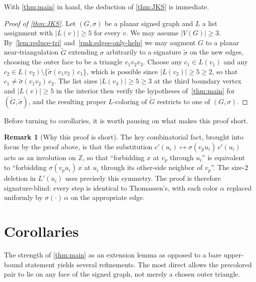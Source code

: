 \documentclass[11pt,a4paper]{article}
\theoremstyle{plain}
\theoremstyle{definition}
\newtheorem{remark}[theorem]{Remark}
\newcommand{\Z}{\mathbb{Z}}
\newcommand{\V}{V}
\newcommand{\Gs}{(G,\sigma)}
\begin{document}
With \cref{thm:main} in hand, the deduction of \cref{thm:JKS} is
immediate.

\begin{proof}[Proof of \cref{thm:JKS}]
Let $\Gs$ be a planar signed graph and $L$ a list assignment with
$|L(v)|\ge 5$ for every $v$. We may assume $|\V(G)|\ge 3$.
By~\cref{lem:reduce-tri} and~\cref{rmk:edges-only-help} we may
augment $G$ to a planar near-triangulation $\widetilde G$ extending
$\sigma$ arbitrarily to a signature $\widetilde\sigma$ on the new
edges, choosing the outer face to be a triangle $v_1v_2v_3$.
Choose any $c_1\in L(v_1)$ and any
$c_2\in L(v_2)\setminus\{\widetilde\sigma(v_1v_2)\,c_1\}$, which is
possible since $|L(v_2)|\ge 5\ge 2$, so that
$c_1\ne\widetilde\sigma(v_1v_2)\,c_2$. The list sizes
$|L(v_3)|\ge 5\ge 3$ at the third boundary vertex and $|L(v)|\ge 5$
in the interior then verify the hypotheses
of~\cref{thm:main} for $(\widetilde G,\widetilde\sigma)$, and the
resulting proper $L$-coloring of $\widetilde G$ restricts to one
of $\Gs$.
\end{proof}

Before turning to corollaries, it is worth pausing on what makes
this proof short.

\begin{remark}[Why this proof is short]\label{rmk:short}
The key combinatorial fact, brought into focus by the proof above,
is that the substitution $c'(u_i)\mapsto\sigma(v_pu_i)\,c'(u_i)$
acts as an involution on $\Z$, so that ``forbidding $x$ at $v_p$
through $u_i$'' is equivalent to ``forbidding
$\sigma(v_pu_i)\,x$ at $u_i$ through its other-side neighbor of
$v_p$''. The size-$2$ deletion in $L'(u_i)$ uses precisely this
symmetry. The proof is therefore signature-blind: every step is
identical to Thomassen's, with each color $\alpha$ replaced
uniformly by $\sigma(\cdot)\,\alpha$ on the appropriate edge.
\end{remark}

\section{Corollaries}\label{sec:cor}

The strength of \cref{thm:main} as an extension lemma  as opposed
to a bare upper-bound statement  yields several refinements. The
most direct allows the precolored pair to lie on any face of the
signed graph, not merely a chosen outer triangle.
\end{document}
